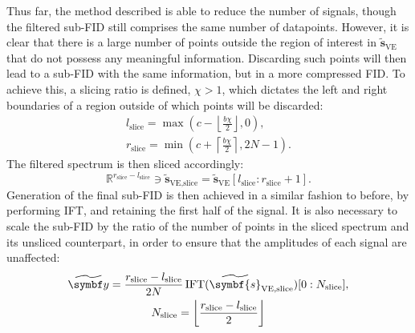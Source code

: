 Thus far, the method described is able to reduce the number of signals,
though the filtered sub-\ac{FID} still comprises the same number of datapoints.
However, it is clear that there is a large number of points outside the region
of interest in $\widetilde{\symbf{s}}_{\text{VE}}$ that do not possess any
meaningful information. Discarding such points will then lead to a sub-\ac{FID}
with the same information, but in a more compressed \ac{FID}. To achieve this,
a slicing ratio is defined, $\chi > 1$, which dictates the
left and right boundaries of a region outside of which points will be discarded:
\begin{subequations}
    \begin{gather}
        l_{\text{slice}} = \max\left(
            c - \left \lfloor \frac{b \chi}{2} \right \rfloor, 0
            \right),\\
        r_{\text{slice}} = \min\left(
            c + \left \lceil \frac{b \chi}{2} \right \rceil, 2N - 1
            \right).
    \end{gather}
\end{subequations}
The filtered spectrum is then sliced accordingly:
\begin{equation}
    \mathbb{R}^{r_{\text{slice}} - l_{\text{slice}}} \ni
    \widetilde{\symbf{s}}_{\text{VE,slice}} =
    \widetilde{\symbf{s}}_{\text{VE}}[l_{\text{slice}} : r_{\text{slice}} + 1]
    .
\end{equation}
Generation of the final sub-\ac{FID} is then achieved in a similar fashion to
before, by performing \ac{IFT}, and retaining the first half of the signal.
It is also necessary to scale the sub-\ac{FID} by the ratio of the number of
points in the sliced spectrum and its unsliced counterpart, in order to ensure
that the amplitudes of each signal are unaffected:
\begin{subequations}
    \begin{gather}
        \widetilde{\by} =
            \frac{r_{\text{slice}} - l_{\text{slice}}}{2N}
            \IFT(\widetilde{\symbf{s}}_{\text{VE,slice}})
            [0 : N_{\text{slice}}],\\
            N_{\text{slice}} = \left \lfloor \frac{r_{\text{slice}} - l_{\text{slice}}}{2} \right \rfloor
    \end{gather}
\end{subequations}
